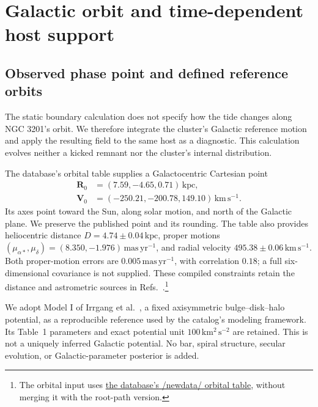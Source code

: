\documentclass[aps,prd,reprint,amsmath,amssymb,superscriptaddress,nofootinbib,longbibliography,floatfix]{revtex4-2}
\begin{document}
\section{Galactic orbit and time-dependent host support}\label{sec:galactic-orbit}

\subsection{Observed phase point and defined reference orbits}

The static boundary calculation does not specify how the tide changes along NGC 3201's orbit. We therefore integrate the cluster's Galactic reference motion and apply the resulting field to the same host as a diagnostic. This calculation evolves neither a kicked remnant nor the cluster's internal distribution.

The database's orbital table supplies a Galactocentric Cartesian point
\begin{align}
\mathbf R_0&=(7.59,-4.65,0.71)\,\mathrm{kpc},\nonumber\\
\mathbf V_0&=(-250.21,-200.78,149.10)\,\mathrm{km\,s^{-1}}.
\label{eq:catalog-phase-point}
\end{align}
Its axes point toward the Sun, along solar motion, and north of the Galactic plane. We preserve the published point and its rounding. The table also provides heliocentric distance $D=4.74\pm0.04\,\mathrm{kpc}$, proper motions $(\mu_{\alpha*},\mu_\delta)=(8.350,-1.976)\,\mathrm{mas\,yr^{-1}}$, and radial velocity $495.38\pm0.06\,\mathrm{km\,s^{-1}}$. Both proper-motion errors are $0.005\,\mathrm{mas\,yr^{-1}}$, with correlation $0.18$; a full six-dimensional covariance is not supplied. These compiled constraints retain the distance and astrometric sources in Refs.~\cite{Baumgardt2021,Vasiliev2021}.\footnote{The orbital input uses \href{https://people.smp.uq.edu.au/HolgerBaumgardt/globular/newdata/orbits.html}{the database's /newdata/ orbital table}, without merging it with the root-path version.}

We adopt Model I of Irrgang et al.~\cite{Irrgang2013}, a fixed axisymmetric bulge--disk--halo potential, as a reproducible reference used by the catalog's modeling framework. Its Table~1 parameters and exact potential unit $100\,\mathrm{km^2\,s^{-2}}$ are retained. This is not a uniquely inferred Galactic potential. No bar, spiral structure, secular evolution, or Galactic-parameter posterior is added.
\end{document}
